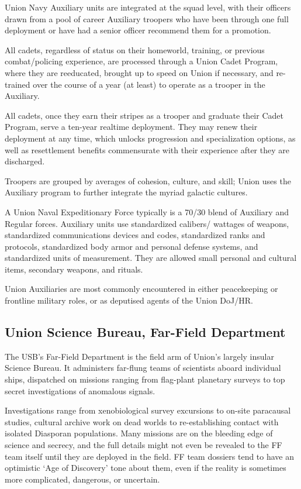 Union Navy Auxiliary units are integrated at the squad level, with their officers drawn from a pool
of career Auxiliary troopers who have been through one full deployment or have had a senior
officer recommend them for a promotion.

All cadets, regardless of status on their homeworld, training, or previous combat/policing
experience, are processed through a Union Cadet Program, where they are reeducated, brought
up to speed on Union if necessary, and re-trained over the course of a year (at least) to operate
as a trooper in the Auxiliary.

All cadets, once they earn their stripes as a trooper and graduate their Cadet Program, serve a
ten-year realtime deployment. They may renew their deployment at any time, which unlocks
progression and specialization options, as well as resettlement benefits commensurate with their
experience after they are discharged.

Troopers are grouped by averages of cohesion, culture, and skill; Union uses the Auxiliary
program to further integrate the myriad galactic cultures.

A Union Naval Expeditionary Force typically is a 70/30 blend of Auxiliary and Regular forces.
Auxiliary units use standardized calibers/ wattages of weapons, standardized communications
devices and codes, standardized ranks and protocols, standardized body armor and personal
defense systems, and standardized units of measurement. They are allowed small personal and
cultural items, secondary weapons, and rituals.

Union Auxiliaries are most commonly encountered in either peacekeeping or frontline military
roles, or as deputised agents of the Union DoJ/HR.

\subsection{Union Science Bureau, Far-Field Department}

The USB's Far-Field Department is the field arm of Union's largely insular Science Bureau. It
administers far-flung teams of scientists aboard individual ships, dispatched on missions ranging
from flag-plant planetary surveys to top secret investigations of anomalous signals.

Investigations range from xenobiological survey excursions to on-site paracausal studies,
cultural archive work on dead worlds to re-establishing contact with isolated Diasporan
populations. Many missions are on the bleeding edge of science and secrecy, and the full details
might not even be revealed to the FF team itself until they are deployed in the field. FF team
dossiers tend to have an optimistic `Age of Discovery' tone about them, even if the reality is
sometimes more complicated, dangerous, or uncertain.

